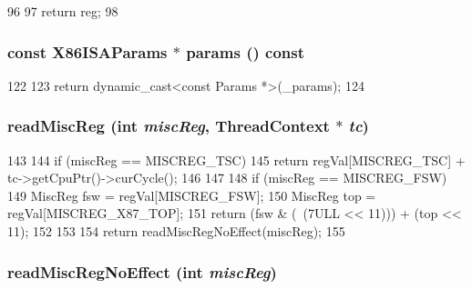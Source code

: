 \begin{DoxyCode}
96         {
97             return reg;
98         }
\end{DoxyCode}
\hypertarget{classX86ISA_1_1ISA_a7a20f1b985970cdbca22d0a4fbf09dd6}{
\subsubsection[{params}]{\setlength{\rightskip}{0pt plus 5cm}const X86ISAParams $\ast$ params () const}}
\label{classX86ISA_1_1ISA_a7a20f1b985970cdbca22d0a4fbf09dd6}



\begin{DoxyCode}
122 {
123     return dynamic_cast<const Params *>(_params);
124 }
\end{DoxyCode}
\hypertarget{classX86ISA_1_1ISA_ac9a5ba47c1dd9552c65c3164fba45f20}{
\subsubsection[{readMiscReg}]{ readMiscReg (int {\em miscReg}, \/  {\bf ThreadContext} $\ast$ {\em tc})}}
\label{classX86ISA_1_1ISA_ac9a5ba47c1dd9552c65c3164fba45f20}



\begin{DoxyCode}
143 {
144     if (miscReg == MISCREG_TSC) {
145         return regVal[MISCREG_TSC] + tc->getCpuPtr()->curCycle();
146     }
147 
148     if (miscReg == MISCREG_FSW) {
149         MiscReg fsw = regVal[MISCREG_FSW];
150         MiscReg top = regVal[MISCREG_X87_TOP];
151         return (fsw & (~(7ULL << 11))) + (top << 11);
152     }
153 
154     return readMiscRegNoEffect(miscReg);
155 }
\end{DoxyCode}
\hypertarget{classX86ISA_1_1ISA_a8147f1448b78d0de3f86766175429e19}{
\subsubsection[{readMiscRegNoEffect}]{ readMiscRegNoEffect (int {\em miscReg})}}
\label{classX86ISA_1_1ISA_a8147f1448b78d0de3f86766175429e19}



